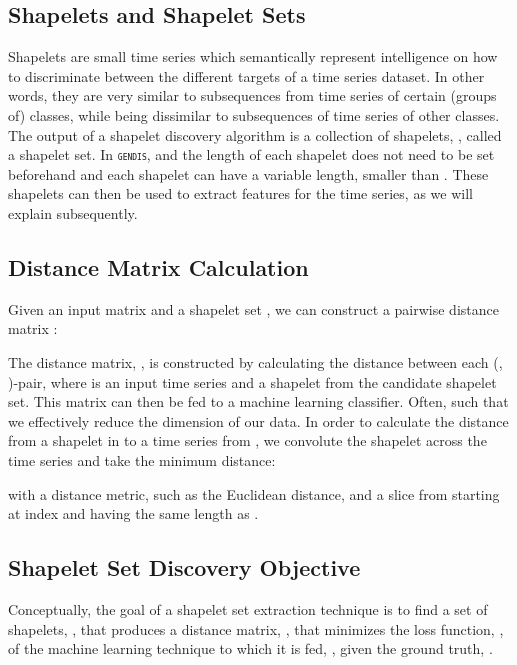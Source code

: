 \documentclass[runningheads]{llncs}
\begin{document}
\subsection{Shapelets and Shapelet Sets}\label{subsec:method_shapelet}
Shapelets are small time series which semantically represent intelligence on how to discriminate between the different targets of a time series dataset. In other words, they are very similar to subsequences from time series of certain (groups of) classes, while being dissimilar to subsequences of time series of other classes. The output of a shapelet discovery algorithm is a collection of  shapelets, , called a shapelet set. In \textsc{\texttt{gendis}},  and the length of each shapelet does not need to be set beforehand and each shapelet can have a variable length, smaller than . These  shapelets can then be used to extract features for the time series, as we will explain subsequently.

\subsection{Distance Matrix Calculation}\label{subsec:method_distance}
Given an input matrix  and a shapelet set , we can construct a pairwise distance matrix :



The distance matrix, , is constructed by calculating the distance between each (, )-pair, where  is an input time series and  a shapelet from the candidate shapelet set. This matrix can then be fed to a machine learning classifier. Often,  such that we effectively reduce the dimension of our data. In order to calculate the distance from a shapelet  in  to a time series  from , we convolute the shapelet across the time series and take the minimum distance:

with  a distance metric, such as the Euclidean distance, and  a slice from  starting at index  and having the same length as .

\subsection{Shapelet Set Discovery Objective}\label{subsec:shapelet_extraction}
Conceptually, the goal of a shapelet set extraction technique is to find a set of shapelets, , that produces a distance matrix, , that minimizes the loss function, , of the machine learning technique to which it is fed, , given the ground truth, . 

 \\
\end{document}
